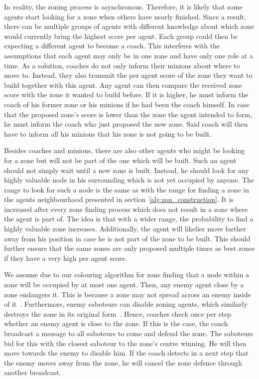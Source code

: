 In reality, the zoning process is asynchronous. Therefore, it is likely that some agents start looking for a zone when others have nearly finished. Since a result, there can be multiple groups of agents with different knowledge about which zone would currently bring the highest score per agent. Each group could then be expecting a different agent to become a coach. This interferes with the assumptions that each agent may only be in one zone and have only one role at a time. As a solution, coaches do not only inform their minions about where to move to. Instead, they also transmit the per agent score of the zone they want to build together with this agent. Any agent can then compare the received zone score with the zone it wanted to build before. If it is higher, he must inform the coach of his former zone or his minions if he had been the coach himself. In case that the proposed zone's score is lower than the zone the agent intended to form, he must inform the coach who just proposed the new zone. Said coach will then have to inform all his minions that his zone is not going to be built.

Besides coaches and minions, there are also other agents who might be looking for a zone but will not be part of the one which will be built. Such an agent should not simply wait until a new zone is built. Instead, he should look for any highly valuable node in his surrounding which is not yet occupied by anyone. The range to look for such a node is the same as with the range for finding a zone in the agents neighbourhood presented in section~\ref{alg:zon_construction}. It is increased after every zone finding process which does not result in a zone where the agent is part of. The idea is that with a wider range, the probability to find a highly valuable zone increases. Additionally, the agent will likelier move farther away from his position in case he is not part of the zone to be built. This should further ensure that the same zones are only proposed multiple times as best zones if they have a very high per agent score.

We assume due to our colouring algorithm for zone finding that a node within a zone will be occupied by at most one agent. %
Then, any enemy agent close by a zone endangers it. This is because a zone may not spread across an enemy inside of it~\cite{ahlbrecht_mapc_2014}. %
Furthermore, enemy saboteurs can disable zoning agents, which similarly destroys the zone in its original form~\cite{ahlbrecht_mapc_2014}. %
Hence, coaches check once per step whether an enemy agent is close to the zone. If this is the case, the coach broadcast a message to all saboteurs to come and defend the zone. The saboteurs bid for this with the closest saboteur to the zone's centre winning. He will then move towards the enemy to disable him. If the coach detects in a next step that the enemy moves away from the zone, he will cancel the zone defence through another broadcast.
